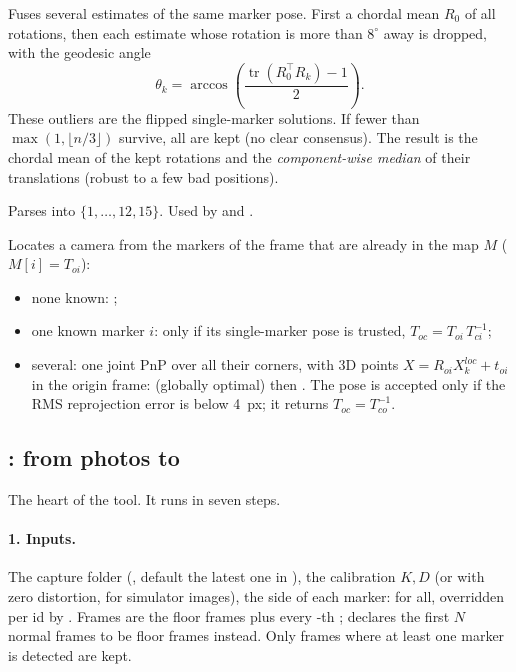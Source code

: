 Fuses several estimates of the same marker pose. First a chordal mean $R_0$ of all rotations, then each estimate
whose rotation is more than $8^\circ$ away is dropped, with the geodesic angle
\[
\theta_k = \arccos\!\left(\frac{\operatorname{tr}(R_0^\top R_k) - 1}{2}\right).
\]
These outliers are the flipped single-marker solutions. If fewer than $\max(1, \lfloor n/3\rfloor)$ survive, all are
kept (no clear consensus). The result is the chordal mean of the kept rotations and the \emph{component-wise
median} of their translations (robust to a few bad positions).

Parses  into $\lbrace 1,\dots,12,15\rbrace$. Used by  and .

Locates a camera from the markers of the frame that are already in the map $M$ ($M[i] = T_{oi}$):
\begin{itemize}[nosep]
\item none known: ;
\item one known marker $i$: only if its single-marker pose is trusted, $T_{oc} = T_{oi}\, T_{ci}^{-1}$;
\item several: one joint PnP over all their corners, with 3D points
  $X = R_{oi} X^{loc}_k + t_{oi}$ in the origin frame:  (globally optimal) then
  . The pose is accepted only if the RMS reprojection error is below 4~px; it returns
  $T_{oc} = T_{co}^{-1}$.
\end{itemize}

\subsection{\texorpdfstring{}{cmd\_solve}: from photos to \texorpdfstring{}{markers.yaml}}

The heart of the tool. It runs in seven steps.

\paragraph{1. Inputs.} The capture folder (, default the latest one in ),
the calibration $K, D$ (or  with zero distortion, for simulator images), the side of each
marker:  for all, overridden per id by . Frames are the floor
frames plus every -th ;  declares the first $N$ normal
frames to be floor frames instead. Only frames where at least one marker is detected are kept.

